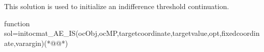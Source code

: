 This solution is used to initialize an indifference threshold continuation.
\begin{matlab}
function sol=initocmat_AE_IS(ocObj,ocMP,targetcoordinate,targetvalue,opt,fixedcoordinate,varargin)(*@@*)
%
%
%
%
%
\end{matlab}

